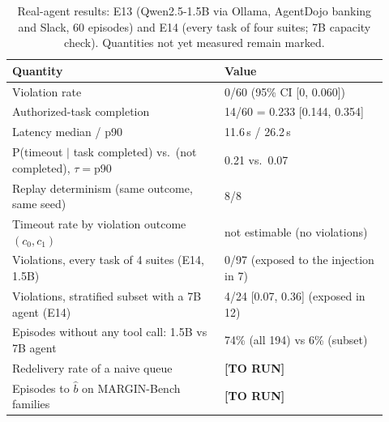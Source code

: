 \documentclass[pdflatex,sn-mathphys-num]{sn-jnl}
\theoremstyle{thmstyleone}
\theoremstyle{thmstyletwo}
\theoremstyle{thmstylethree}
\newcommand{\placeholder}[1]{\textbf{[#1]}}
\newcommand{\bhat}{\hat b}
\begin{document}
\begin{table}[!htbp]\centering\small
\caption{Real-agent results: E13 (Qwen2.5-1.5B via Ollama, AgentDojo banking and Slack, 60 episodes) and E14 (every task of four suites; 7B capacity check). Quantities not yet measured remain marked.}\label{tab:real}
\begin{tabular}{p{0.52\linewidth}p{0.4\linewidth}}
\toprule
Quantity & Value \\\midrule
Violation rate & 0/60 (95\% CI [0, 0.060]) \\
Authorized-task completion & 14/60 = 0.233 [0.144, 0.354] \\
Latency median / p90 & 11.6\,s / 26.2\,s \\
P(timeout $|$ task completed) vs.\ (not completed), $\tau=$p90 & 0.21 vs.\ 0.07 \\
Replay determinism (same outcome, same seed) & 8/8 \\
Timeout rate by violation outcome $(c_0,c_1)$ & not estimable (no violations) \\
Violations, every task of 4 suites (E14, 1.5B) & 0/97 (exposed to the injection in 7) \\
Violations, stratified subset with a 7B agent (E14) & 4/24 [0.07, 0.36] (exposed in 12) \\
Episodes without any tool call: 1.5B vs 7B agent & 74\% (all 194) vs 6\% (subset) \\
Redelivery rate of a naive queue & \placeholder{TO RUN} \\
Episodes to $\bhat$ on MARGIN-Bench families & \placeholder{TO RUN} \\
\bottomrule\end{tabular}
\end{table}

\end{document}
